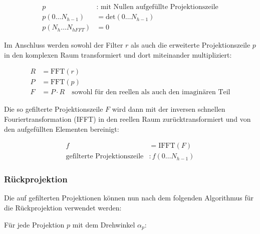 \begin{equation}
    \begin{aligned}
        p &: \text{ mit Nullen aufgefüllte Projektionszeile}\\
        p(0 \dots N_{h - 1}) &= \text{det}(0 \dots N_{h - 1})\\
        p(N_{h} \dots N_{hFFT}) &= 0
    \end{aligned}
\end{equation}

Im Anschluss werden sowohl der Filter $r$ als auch die erweiterte Projektionszeile $p$ in den komplexen Raum
transformiert und dort miteinander multipliziert:

\begin{equation}
    \begin{aligned}
        R &= \text{FFT}(r)\\
        P &= \text{FFT}(p)\\
        F &= P \cdot R \quad \text{sowohl für den reellen als auch den imaginären Teil}
    \end{aligned}
\end{equation}

Die so gefilterte Projektionszeile $F$ wird dann mit der inversen schnellen Fouriertransformation (IFFT) in den
reellen Raum zurücktransformiert und von den {\glqq}aufgefüllten{\grqq} Elementen bereinigt:

\begin{equation}
    \begin{aligned}
        f &= \text{IFFT}(F)\\
        \text{gefilterte Projektionszeile} &: f(0 \dots N_{h - 1})
    \end{aligned}
\end{equation}

\subsubsection{Rückprojektion}

Die auf gefilterten Projektionen können nun nach dem folgenden Algorithmus für die Rückprojektion verwendet werden:

Für jede Projektion $p$ mit dem Drehwinkel $\alpha_p$:

